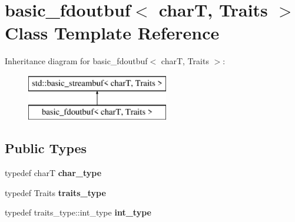 \hypertarget{classbasic__fdoutbuf}{\section{basic\-\_\-fdoutbuf$<$ char\-T, Traits $>$ Class Template Reference}
\label{classbasic__fdoutbuf}
}
Inheritance diagram for basic\-\_\-fdoutbuf$<$ char\-T, Traits $>$\-:\begin{figure}[H]
\begin{center}
\leavevmode
\includegraphics[height=2.000000cm]{classbasic__fdoutbuf}
\end{center}
\end{figure}
\subsection*{Public Types}
\begin{DoxyCompactItemize}
\item 
\hypertarget{classbasic__fdoutbuf_a5fff30ae99aa4f8f11c805c145f4e7a0}{typedef char\-T {\bfseries char\-\_\-type}}\label{classbasic__fdoutbuf_a5fff30ae99aa4f8f11c805c145f4e7a0}

\item 
\hypertarget{classbasic__fdoutbuf_a784a44bb01bb9097c40a308e07573a42}{typedef Traits {\bfseries traits\-\_\-type}}\label{classbasic__fdoutbuf_a784a44bb01bb9097c40a308e07573a42}

\item 
\hypertarget{classbasic__fdoutbuf_a9aaa9fc31aff41f0123eed8a844fe737}{typedef traits\-\_\-type\-::int\-\_\-type {\bfseries int\-\_\-type}}\label{classbasic__fdoutbuf_a9aaa9fc31aff41f0123eed8a844fe737}

\end{DoxyCompactItemize}
